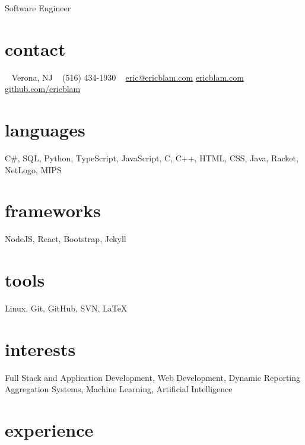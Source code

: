 \documentclass[]{friggeri-cv}
\begin{document}
       {Software Engineer}

\begin{aside}
  \section{contact}
    ~
    Verona, NJ
    ~
    (516) 434-1930
    ~
    \href{mailto:eric@ericblam.com}{eric@ericblam.com}
    \href{http://ericblam.com}{ericblam.com}
    \href{http://github.com/ericblam}{github.com/ericblam}
  \section{languages}
    C\#, SQL, Python, TypeScript, JavaScript, C, C++, HTML, CSS, Java, Racket, NetLogo, MIPS
  \section{frameworks}
    NodeJS, React, Bootstrap, Jekyll
  \section{tools}
    Linux, Git, GitHub, SVN, \LaTeX
\end{aside}

\section{interests}

Full Stack and Application Development, Web Development, Dynamic Reporting Aggregation Systems, Machine Learning, Artificial Intelligence

\section{experience}
\end{document}
